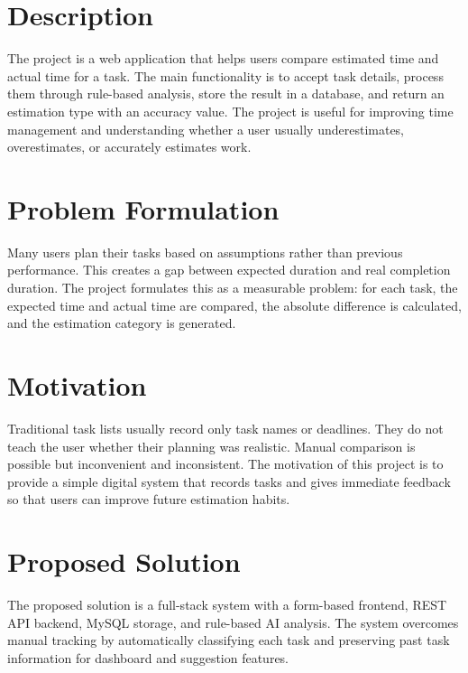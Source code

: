 \section{Description}
\begin{justify}
The project is a web application that helps users compare estimated time and actual time for a task. The main functionality is to accept task details, process them through rule-based analysis, store the result in a database, and return an estimation type with an accuracy value. The project is useful for improving time management and understanding whether a user usually underestimates, overestimates, or accurately estimates work.
\end{justify}

\section{Problem Formulation}
\begin{justify}
Many users plan their tasks based on assumptions rather than previous performance. This creates a gap between expected duration and real completion duration. The project formulates this as a measurable problem: for each task, the expected time and actual time are compared, the absolute difference is calculated, and the estimation category is generated.
\end{justify}

\section{Motivation}
\begin{justify}
Traditional task lists usually record only task names or deadlines. They do not teach the user whether their planning was realistic. Manual comparison is possible but inconvenient and inconsistent. The motivation of this project is to provide a simple digital system that records tasks and gives immediate feedback so that users can improve future estimation habits.
\end{justify}

\section{Proposed Solution}
\begin{justify}
The proposed solution is a full-stack system with a form-based frontend, REST API backend, MySQL storage, and rule-based AI analysis. The system overcomes manual tracking by automatically classifying each task and preserving past task information for dashboard and suggestion features.
\end{justify}


